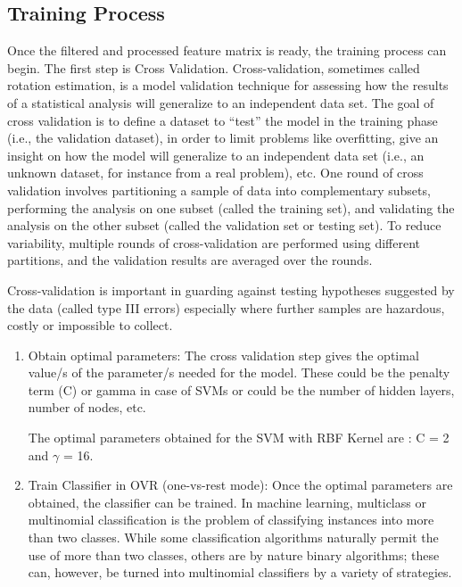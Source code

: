 \documentclass[letterpaper,12pt, onecolumn]{article}%
\begin{document}
\subsection{Training Process}
Once the filtered and processed feature matrix is ready, the training process can begin. The first step is Cross Validation. Cross-validation, sometimes called rotation estimation, is a model validation technique for assessing how the results of a statistical analysis will generalize to an independent data set. The goal of cross validation is to define a dataset to \enquote{test} the model in the training phase (i.e., the validation dataset), in order to limit problems like overfitting, give an insight on how the model will generalize to an independent data set (i.e., an unknown dataset, for instance from a real problem), etc. One round of cross validation involves partitioning a sample of data into complementary subsets, performing the analysis on one subset (called the training set), and validating the analysis on the other subset (called the validation set or testing set). To reduce variability, multiple rounds of cross-validation are performed using different partitions, and the validation results are averaged over the rounds.

Cross-validation is important in guarding against testing hypotheses suggested by the data (called type III errors) especially where further samples are hazardous, costly or impossible to collect.

\begin{enumerate}
\item Obtain optimal parameters: The cross validation step gives the optimal value/s of the parameter/s needed for the model. These could be the penalty term (C) or gamma in case of SVMs or could be the number of hidden layers, number of nodes, etc. 

The optimal parameters obtained for the SVM with RBF Kernel are :  C = 2 and $\gamma$ = 16.

\item Train Classifier in OVR (one-vs-rest mode): Once the optimal parameters are obtained, the classifier can be trained.
In machine learning, multiclass or multinomial classification is the problem of classifying instances into more than two classes. While some classification algorithms naturally permit the use of more than two classes, others are by nature binary algorithms; these can, however, be turned into multinomial classifiers by a variety of strategies.
\end{enumerate}
\end{document}
